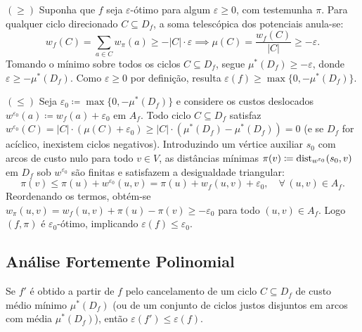 \begin{demonstracao}
$(\ge)$ Suponha que $f$ seja $\varepsilon$-ótimo para algum $\varepsilon \ge 0$, com testemunha $\pi$. Para qualquer ciclo direcionado $C \subseteq D_f$, a soma telescópica dos potenciais anula-se:
\begin{equation*}
    w_f(C) = \sum_{a \in C} w_\pi(a) \ge -|C| \cdot \varepsilon \implies \mu(C) = \frac{w_f(C)}{|C|} \ge -\varepsilon.
\end{equation*}
Tomando o mínimo sobre todos os ciclos $C \subseteq D_f$, segue $\mu^*(D_f) \ge -\varepsilon$, donde $\varepsilon \ge -\mu^*(D_f)$. Como $\varepsilon \ge 0$ por definição, resulta $\varepsilon(f) \ge \max\{0, -\mu^*(D_f)\}$.

\medskip
\noindent $(\le)$ Seja $\varepsilon_0 \coloneqq \max\{0, -\mu^*(D_f)\}$ e considere os custos deslocados $w^{\varepsilon_0}(a) \coloneqq w_f(a) + \varepsilon_0$ em $A_f$. Todo ciclo $C \subseteq D_f$ satisfaz $w^{\varepsilon_0}(C) = |C|\cdot(\mu(C) + \varepsilon_0) \ge |C|\cdot(\mu^*(D_f) - \mu^*(D_f)) = 0$ (e se $D_f$ for acíclico, inexistem ciclos negativos). Introduzindo um vértice auxiliar $s_0$ com arcos de custo nulo para todo $v \in V$, as distâncias mínimas $\pi(v) \coloneqq \operatorname{dist}_{w^{\varepsilon_0}}(s_0, v)$ em $D_f$ sob $w^{\varepsilon_0}$ são finitas e satisfazem a desigualdade triangular:
\begin{equation*}
    \pi(v) \le \pi(u) + w^{\varepsilon_0}(u,v) = \pi(u) + w_f(u,v) + \varepsilon_0, \quad \forall\, (u,v) \in A_f.
\end{equation*}
Reordenando os termos, obtém-se $w_\pi(u,v) = w_f(u,v) + \pi(u) - \pi(v) \ge -\varepsilon_0$ para todo $(u,v) \in A_f$. Logo $(f, \pi)$ é $\varepsilon_0$-ótimo, implicando $\varepsilon(f) \le \varepsilon_0$.
\end{demonstracao}


\subsection{Análise Fortemente Polinomial}

\begin{prop}\label{prop:mmcc_monotonicidade}
Se $f'$ é obtido a partir de $f$ pelo cancelamento de um ciclo $C \subseteq D_f$ de custo médio mínimo $\mu^*(D_f)$ (ou de um conjunto de ciclos justos disjuntos em arcos com média $\mu^*(D_f)$), então $\varepsilon(f') \le \varepsilon(f)$.
\end{prop}

